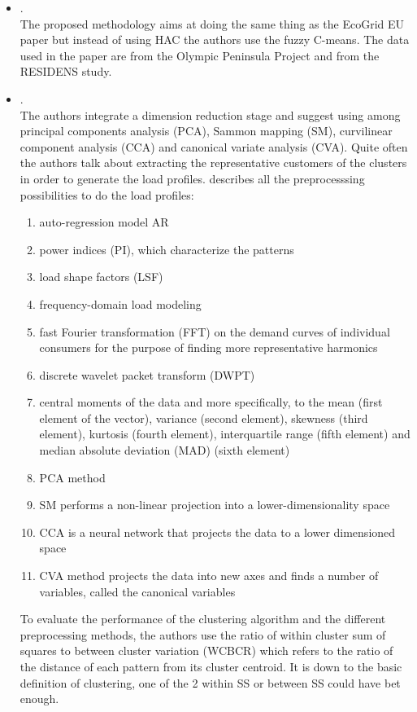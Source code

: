 \begin{itemize}
	\item {}.\\
	 The proposed methodology aims at doing the same thing as the EcoGrid EU paper but instead of using HAC the authors use the fuzzy C-means. The data used in the paper are from the Olympic Peninsula Project and from the RESIDENS study.
	\item {}.\\
	 The authors integrate a dimension reduction stage and suggest using among principal components analysis (PCA), Sammon mapping (SM), curvilinear component analysis (CCA) and canonical variate analysis (CVA). Quite often the authors talk about extracting the representative customers of the clusters in order to generate the load profiles. \citeauthor{Panapakidis2015} describes all the preprocesssing possibilities to do the load profiles:
	 \begin{enumerate}
	 	\item auto-regression model AR
	 	\item power indices (PI), which characterize the patterns
	 	\item load shape factors (LSF)
	 	\item frequency-domain load modeling
	 	\item fast Fourier transformation (FFT) on the demand curves of individual consumers for the purpose of finding more representative harmonics
	 	\item discrete wavelet packet transform (DWPT)
	 	\item central moments of the data and more specifically, to the mean (first element of the vector), variance (second element), skewness (third element), kurtosis (fourth element), interquartile range (fifth element) and median absolute deviation (MAD) (sixth element)
	 	\item PCA method
	 	\item SM performs a non-linear projection into a lower-dimensionality space
	 	\item CCA is a neural network that projects the data to a lower dimensioned space
	 	\item CVA method projects the data into new axes and finds a number of variables, called the canonical variables
	 \end{enumerate}
	 To evaluate the performance of the clustering algorithm and the different preprocessing methods, the authors use the ratio of within cluster sum of squares to between cluster variation (WCBCR) which refers to the ratio of the distance of each pattern from its cluster centroid. It is down to the basic definition of clustering, one of the 2 within SS or between SS could have bet enough.

\end{itemize}
